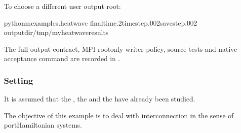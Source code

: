 \documentclass[letterpaper,10pt,english]{sphinxmanual}
\begin{document}
\sphinxAtStartPar
To choose a different user output root:

\begin{sphinxVerbatim}[commandchars=\\\{\}]
python\PYGZhy{}mexamples.heat\PYGZus{}wave
\PYGZhy{}\PYGZhy{}final\PYGZhy{}time.2\PYGZhy{}\PYGZhy{}time\PYGZhy{}step.002\PYGZhy{}\PYGZhy{}save\PYGZhy{}step.002
\PYGZhy{}\PYGZhy{}output\PYGZhy{}dir/tmp/my\PYGZhy{}heat\PYGZhy{}wave\PYGZhy{}results
\end{sphinxVerbatim}

\sphinxAtStartPar
The full output contract, MPI root\sphinxhyphen{}only writer
policy, source tests and native acceptance command
are recorded in
.


\subsubsection{Setting}
\label{\detokenize{examples/heat_wave:setting}}
\sphinxAtStartPar
It is assumed that the , the
and the  have
already been studied.

\sphinxAtStartPar
The objective of this example is to deal with interconnection in the
sense of port\sphinxhyphen{}Hamiltonian systems.
\end{document}
